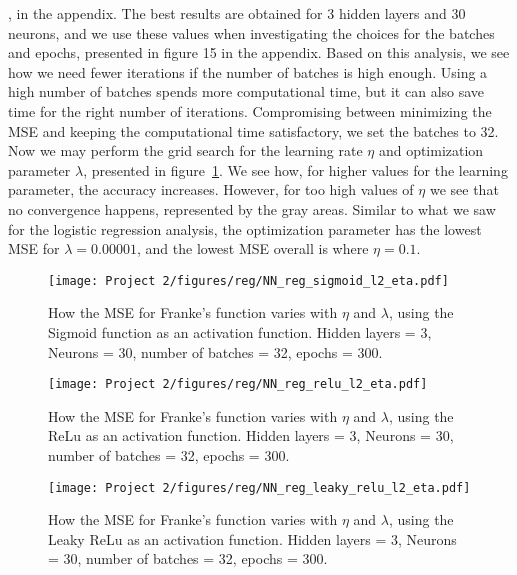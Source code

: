 \documentclass[english,notitlepage,reprint,nofootinbib]{revtex4-2}  %
\begin{document}
, in the appendix. 
The best results are obtained for 3 hidden layers and 30 neurons, and we use these values when investigating the choices for the batches and epochs, presented in figure 15
in the appendix. Based on this analysis, we see how we need fewer iterations if the number of batches is high enough. Using a high number of batches spends more computational time, but it can also save time for the right number of iterations. Compromising between minimizing the MSE and keeping the computational time satisfactory, we set the batches to 32. 
\vspace{3mm}
\\ 
Now we may perform the grid search for the learning rate $\eta$ and optimization parameter $\lambda$, presented in figure~\ref{fig: b_sigmoid_3}. We see how, for higher values for the learning parameter, the accuracy increases. However, for too high values of $\eta$ we see that no convergence happens, represented by the gray areas. Similar to what we saw for the logistic regression analysis, the optimization parameter has the lowest MSE for $\lambda = 0.00001$, and the lowest MSE overall is where $\eta=0.1$. 
\begin{figure}[h!]
    \centering %
    \texttt{[image: Project 2/figures/reg/NN\_reg\_sigmoid\_l2\_eta.pdf]} 
    \caption{How the MSE for Franke's function varies with $\eta$ and $\lambda$, using the Sigmoid function as an activation function. 
    Hidden layers = 3, Neurons = 30, number of batches = 32, epochs = 300.}
    \label{fig: b_sigmoid_3}
\end{figure}
\begin{figure}[h!]
    \centering %
    \texttt{[image: Project 2/figures/reg/NN\_reg\_relu\_l2\_eta.pdf]} 
    \caption{How the MSE for Franke's function varies with $\eta$ and $\lambda$, using the ReLu as an activation function. 
    Hidden layers = 3, Neurons = 30, number of batches = 32, epochs = 300.}
    \label{fig: b_relu}
\end{figure}
\begin{figure}[h!]
    \centering %
    \texttt{[image: Project 2/figures/reg/NN\_reg\_leaky\_relu\_l2\_eta.pdf]} 
    \caption{How the MSE for Franke's function varies with $\eta$ and $\lambda$, using the Leaky ReLu as an activation function. 
    Hidden layers = 3, Neurons = 30, number of batches = 32, epochs = 300.}
    \label{fig: b_lrelu}
\end{figure}
\end{document}
